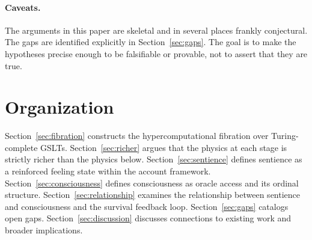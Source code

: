 \paragraph{Caveats.}
The arguments in this paper are skeletal and in several places
frankly conjectural.
The gaps are identified explicitly in Section~\ref{sec:gaps}.
The goal is to make the hypotheses precise enough to be falsifiable
or provable, not to assert that they are true.

\section{Organization}

Section~\ref{sec:fibration} constructs the hypercomputational
fibration over Turing-complete GSLTs.
Section~\ref{sec:richer} argues that the physics at each stage is
strictly richer than the physics below.
Section~\ref{sec:sentience} defines sentience as a reinforced
feeling state within the account framework.
Section~\ref{sec:consciousness} defines consciousness as oracle
access and its ordinal structure.
Section~\ref{sec:relationship} examines the relationship between
sentience and consciousness and the survival feedback loop.
Section~\ref{sec:gaps} catalogs open gaps.
Section~\ref{sec:discussion} discusses connections to existing
work and broader implications.

